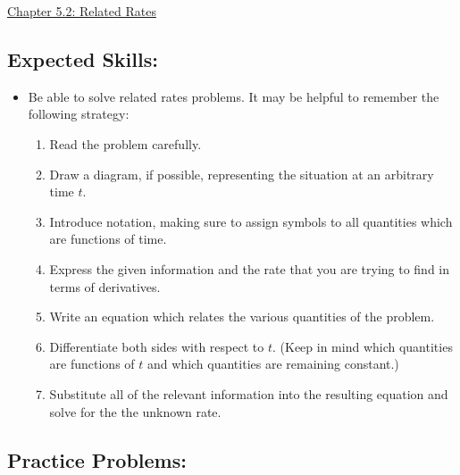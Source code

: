 \documentclass[12pt]{article}
\begin{document}
\begin{center}
\underline{\LARGE{Chapter 5.2: Related Rates}}
\end{center}

\subsection*{Expected Skills:}

\begin{itemize}

\item Be able to solve related rates problems. It may be helpful to remember the following strategy:

\begin{enumerate}

\item Read the problem carefully.

\item Draw a diagram, if possible, representing the situation at an arbitrary time $t$.

\item Introduce notation, making sure to assign symbols to all quantities which are functions of time.

\item Express the given information and the rate that you are trying to find in terms of derivatives.

\item Write an equation which relates the various quantities of the problem. 

\item Differentiate both sides with respect to $t$.  (Keep in mind which quantities are functions of $t$ and which quantities are remaining constant.)

\item Substitute all of the relevant information into the resulting equation and solve for the the unknown rate.

\end{enumerate}

\end{itemize}

\subsection*{Practice Problems: }

\medskip
\end{document}
